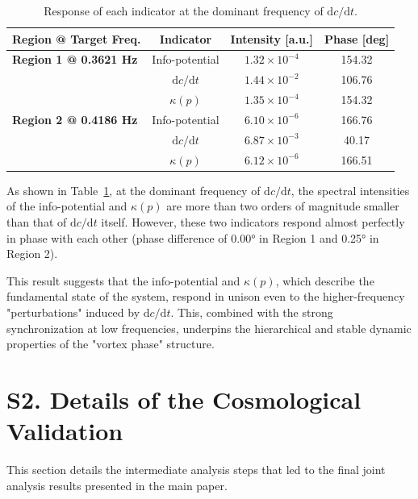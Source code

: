 \documentclass[a4paper,12pt]{article}
\begin{document}
\begin{table}[H]
    \centering
    \caption{Response of each indicator at the dominant frequency of $\mathrm{d}c/\mathrm{d}t$.}
    \label{tab:supp_fft_re_results}
    \begin{tabular}{@{}lccc@{}}
        \toprule
        \textbf{Region @ Target Freq.} & \textbf{Indicator} & \textbf{Intensity [a.u.]} & \textbf{Phase [deg]} \\
        \midrule
        \textbf{Region 1 @ 0.3621 Hz} & Info-potential & $1.32 \times 10^{-4}$ & 154.32 \\
                         & $\mathrm{d}c/\mathrm{d}t$ & $1.44 \times 10^{-2}$ & 106.76 \\
                         & $\kappa(p)$ & $1.35 \times 10^{-4}$ & 154.32 \\
        \midrule
        \textbf{Region 2 @ 0.4186 Hz} & Info-potential & $6.10 \times 10^{-6}$ & 166.76 \\
                         & $\mathrm{d}c/\mathrm{d}t$ & $6.87 \times 10^{-3}$ & 40.17 \\
                         & $\kappa(p)$ & $6.12 \times 10^{-6}$ & 166.51 \\
        \bottomrule
    \end{tabular}
\end{table}

As shown in Table~\ref{tab:supp_fft_re_results}, at the dominant frequency of $\mathrm{d}c/\mathrm{d}t$, the spectral intensities of the info-potential and $\kappa(p)$ are more than two orders of magnitude smaller than that of $\mathrm{d}c/\mathrm{d}t$ itself. However, these two indicators respond almost perfectly in phase with each other (phase difference of 0.00° in Region 1 and 0.25° in Region 2).

This result suggests that the info-potential and $\kappa(p)$, which describe the fundamental state of the system, respond in unison even to the higher-frequency "perturbations" induced by $\mathrm{d}c/\mathrm{d}t$. This, combined with the strong synchronization at low frequencies, underpins the hierarchical and stable dynamic properties of the "vortex phase" structure.


\section*{S2. Details of the Cosmological Validation}
\label{sec:supp_cosmological_validation}

This section details the intermediate analysis steps that led to the final joint analysis results presented in the main paper.
\end{document}
